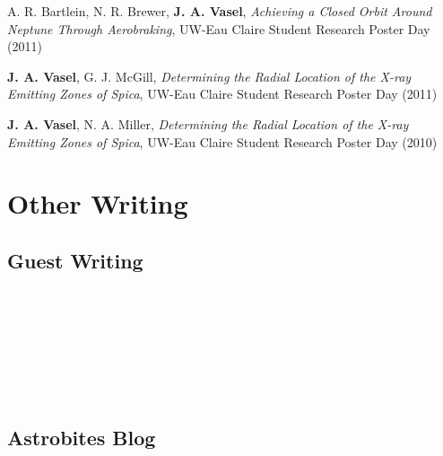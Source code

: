 \documentclass{cv}
\begin{document}
\begin{resume}
A. R. Bartlein, N. R. Brewer, \textbf{J. A. Vasel}, \emph{Achieving a Closed Orbit Around Neptune Through Aerobraking}, UW-Eau Claire Student Research Poster Day (2011)

\textbf{J. A. Vasel}, G. J. McGill, \emph{Determining the Radial Location of the X-ray Emitting Zones of Spica}, UW-Eau Claire Student Research Poster Day (2011)

\textbf{J. A. Vasel}, N. A. Miller, \emph{Determining the Radial Location of the X-ray Emitting Zones of Spica}, UW-Eau Claire Student Research Poster Day (2010)



\section{Other Writing}

\vspace{-0.21in}
\subsection{\sc Guest Writing}



 \hfill \date{20 September 2014} \\
\itemSep

 \hfill \date{20 October 2012} \\
\itemSep

 \hfill \date{18 June 2011} \\
\itemSep

 \hfill \date{February 2011} \\

\subsection{\sc Astrobites Blog}

 \hfill \date{16 September 2014}
\itemSep

 \hfill \date{30 April 2014}
\itemSep


\end{resume}
\end{document}
